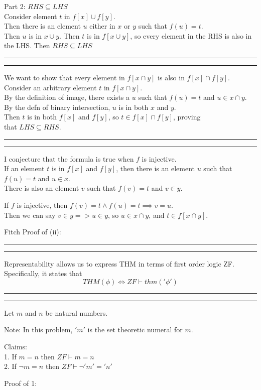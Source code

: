 \documentclass[11pt,letterpaper]{article}
\newcommand{\question}[1] {\vspace{.25in} \hrule\vspace{0.5em}
\noindent{\bf #1} \vspace{0.5em}
\hrule \vspace{.10in}}
\begin{document}
Part 2: $RHS \subseteq LHS$\\
Consider element $t$ in $f[x] \cup f[y]$.\\
Then there is an element $u$ either in $x$ or $y$ such that $f(u) = t$.\\
Then $u$ is in $x \cup y$. Then $t$ is in $f[x \cup y]$, so every element in the RHS is also in the LHS.
Then $RHS \subseteq LHS$

\question{2.ii}
We want to show that every element in $f[x \cap y]$ is also in $f[x] \cap f[y]$.\\
Consider an arbitrary element $t$ in $f[x \cap y]$.\\
By the definition of image, there exists a $u$ such that $f(u) = t$ and $u \in x \cap y$.\\
By the defn of binary intersection, $u$ is in both $x$ and $y$.\\
Then $t$ is in both $f[x]$ and $f[y]$, so $t \in f[x] \cap f[y]$, proving\\
that $LHS \subseteq RHS$.\\

\question{2.iii}
I conjecture that the formula is true when $f$ is injective.\\

If an element $t$ is in $f[x]$ and $f[y]$, then there is an element $u$ such that $f(u) = t$ and $u \in x$.\\
There is also an element $v$ such that $f(v) = t$ and $v \in y$.

If $f$ is injective, then $f(v) = t \wedge f(u) = t \implies v = u$.\\
Then we can say $v \in y => u \in y$, so $u \in x \cap y$, and $t \in f[x \cap y]$.

Fitch Proof of (ii):\\

\question{3.i}
Representability allows us to express THM in terms of first order logic ZF. Specifically,
it states that
$$THM(\phi) \iff  ZF \vdash thm('\phi')$$

\question{3.ii}
Let $m$ and $n$ be natural numbers.

Note: In this problem, $'m'$ is the set theoretic numeral for $m$.

Claims:\\
1. If $m = n$ then $ZF \vdash m=n$\\
2. If $\neg m = n$ then $ZF \vdash \neg 'm'='n'$

Proof of 1:\\
\end{document}
